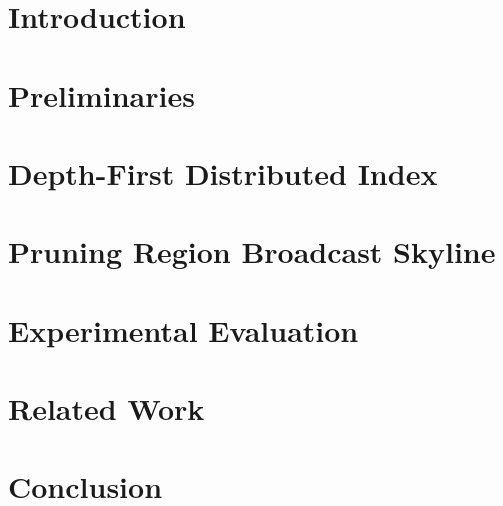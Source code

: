 \documentclass[10pt,conference,letterpaper]{IEEEtran}
\begin{document}



\section{Introduction}\label{sec-intro}


\section{Preliminaries}\label{sec-prelim}


\section{Depth-First Distributed Index}


\section{Pruning Region Broadcast Skyline}


\section{Experimental Evaluation}


\section{Related Work}\label{sec-related-works}


\section{Conclusion}



\small{


}
\end{document}
